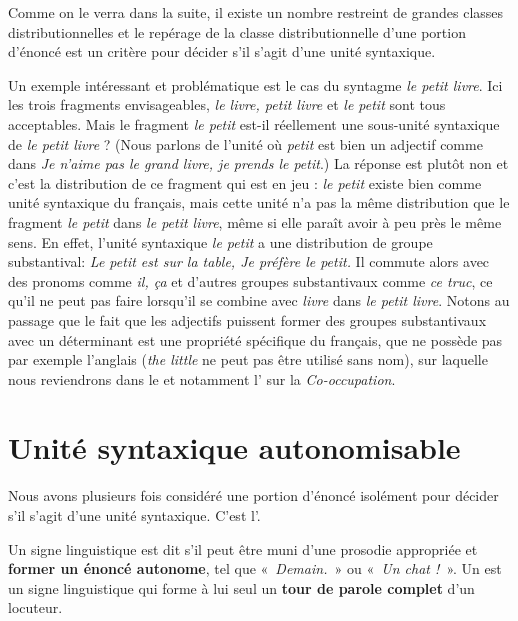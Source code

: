 Comme on le verra dans la suite, il existe un nombre restreint de grandes classes distributionnelles et le repérage de la classe distributionnelle d’une portion d’énoncé est un critère pour décider s’il s’agit d’une unité syntaxique.

Un exemple intéressant et problématique est le cas du syntagme \textit{le petit livre}. Ici les trois fragments envisageables, \textit{le livre, petit livre} et \textit{le petit} sont tous acceptables. Mais le fragment \textit{le petit} est-il réellement une sous-unité syntaxique de \textit{le petit livre} ? (Nous parlons de l’unité où \textit{petit} est bien un adjectif comme dans \textit{Je n’aime pas le grand livre, je prends le petit}.) La réponse est plutôt non et c’est la distribution de ce fragment qui est en jeu : \textit{le petit} existe bien comme unité syntaxique du français, mais cette unité n’a pas la même distribution que le fragment \textit{le petit} dans \textit{le petit livre}, même si elle paraît avoir à peu près le même sens. En effet, l’unité syntaxique \textit{le petit} a une distribution de groupe substantival: \textit{Le petit est sur la table, Je préfère le petit.} Il commute alors avec des pronoms comme \textit{il, ça} et d’autres groupes substantivaux comme \textit{ce truc}, ce qu’il ne peut pas faire lorsqu’il se combine avec \textit{livre} dans \textit{le petit livre}. Notons au passage que le fait que les adjectifs puissent former des groupes substantivaux avec un déterminant est une propriété spécifique du français, que ne possède pas par exemple l’anglais (\textit{the little} ne peut pas être utilisé sans nom), sur laquelle nous reviendrons dans le  et notamment l’ sur la \textit{Co-occupation}.

\section{Unité syntaxique autonomisable}\label{sec:3.2.11}

Nous avons plusieurs fois considéré une portion d’énoncé isolément pour décider s’il s’agit d’une unité syntaxique. C’est l’.

\begin{styleLivreImportant}
Un signe linguistique est dit  s’il peut être muni d’une prosodie appropriée et \textbf{former un énoncé autonome}, tel que «~\textit{Demain.~}» ou «~\textit{Un chat !~}». Un  est un signe linguistique qui forme à lui seul un \textbf{tour de parole complet} d’un locuteur.
\end{styleLivreImportant}

